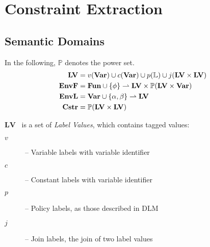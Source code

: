 
\newcommand{\iR}{\mathcal{R}}
\newcommand{\iD}{\mathcal{D}}
\newcommand{\iV}{\mathcal{V}}
\newcommand{\iF}{\mathcal{F}}
\newcommand{\iS}{\mathcal{S}}
\newcommand{\iE}{\mathcal{E}}
\newcommand{\iL}{\mathcal{L}}
\newcommand{\iO}{\mathcal{O}}

\newcommand{\iLV}{\mathbf{LV}}
\newcommand{\ilv}{lv}

\newcommand{\dblSq}[1]{[\![ #1 ]\!]}

\newcommand{\seSpace}{\\[1em]} %
\newcommand{\seWhere}[1]{& \quad \text{ where } #1}
\newcommand{\seAnd}[1]{& \quad \text{ and } #1}
\newcommand{\seIf}[1]{& \quad \text{ if } #1}

\newenvironment{semanticequations}{%
  \align%
}{%
  \endalign%
}

\newcommand{\semeq}[4]{%
#1 [\![#2]\!] \ifthenelse{\equal{#3}{}}{}{\; #3} \ifthenelse{\equal{#4}{}}{}{= #4} \nonumber
}

\newcommand{\csemeq}[5]{%
& \semeq{#1}{#2}{#3}{#4} \\
#5 \nonumber
}

\section{Constraint Extraction}

\subsection{Semantic Domains}
In the following, $\mathbb P$ denotes the power set.
\begin{align*}
\iLV    & = v(\iVar) \cup c(\iVar) \cup p(\mathbb{L}) \cup j(\iLV \times \iLV) \\
\iEnvF  & = \iFun \cup \{ \ifb \} \rightharpoonup \iLV \times \mathbb P (\iLV \times \iVar) \\
\iEnvL  & = \iVar \cup \{ \ia, \ib \} \rightharpoonup \iLV \\
\iCstr  & = \mathbb P (\iLV \times \iLV)
\end{align*}

$\iLV$~ is a set of \emph{Label Values}, which contains tagged values:
\begin{description}
  \item[$v$] -- Variable labels with variable identifier
  \item[$c$] -- Constant labels with variable identifier
  \item[$p$] -- Policy labels, as those described in DLM
  \item[$j$] -- Join labels, the join of two label values
\end{description}

